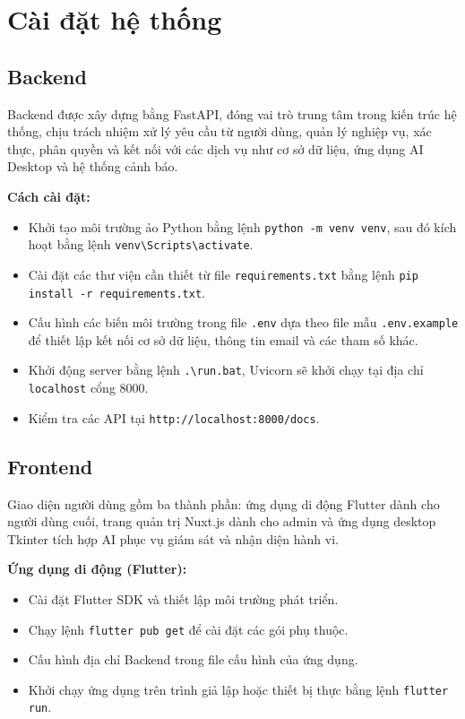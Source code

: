 \section{Cài đặt hệ thống}

\subsection{Backend}

Backend được xây dựng bằng FastAPI, đóng vai trò trung tâm trong kiến trúc hệ thống, chịu trách nhiệm
xử lý yêu cầu từ người dùng, quản lý nghiệp vụ, xác thực, phân quyền và kết nối với các dịch vụ như
cơ sở dữ liệu, ứng dụng AI Desktop và hệ thống cảnh báo.

\noindent\textbf{Cách cài đặt:}
\begin{itemize}
\item Khởi tạo môi trường ảo Python bằng lệnh \texttt{python -m venv venv}, sau đó kích hoạt
bằng lệnh \texttt{venv\textbackslash Scripts\textbackslash activate}.
\item Cài đặt các thư viện cần thiết từ file \texttt{requirements.txt} bằng lệnh
\texttt{pip install -r requirements.txt}.
\item Cấu hình các biến môi trường trong file \texttt{.env} dựa theo file mẫu \texttt{.env.example}
để thiết lập kết nối cơ sở dữ liệu, thông tin email và các tham số khác.
\item Khởi động server bằng lệnh \texttt{.\textbackslash run.bat}, Uvicorn sẽ khởi chạy tại
địa chỉ \texttt{localhost} cổng 8000.
\item Kiểm tra các API tại \texttt{http://localhost:8000/docs}.
\end{itemize}

\subsection{Frontend}

Giao diện người dùng gồm ba thành phần: ứng dụng di động Flutter dành cho người dùng cuối,
trang quản trị Nuxt.js dành cho admin và ứng dụng desktop Tkinter tích hợp AI phục vụ giám sát
và nhận diện hành vi.

\textbf{Ứng dụng di động (Flutter):}
\begin{itemize}
\item Cài đặt Flutter SDK và thiết lập môi trường phát triển.
\item Chạy lệnh \texttt{flutter pub get} để cài đặt các gói phụ thuộc.
\item Cấu hình địa chỉ Backend trong file cấu hình của ứng dụng.
\item Khởi chạy ứng dụng trên trình giả lập hoặc thiết bị thực bằng lệnh \texttt{flutter run}.
\end{itemize}

